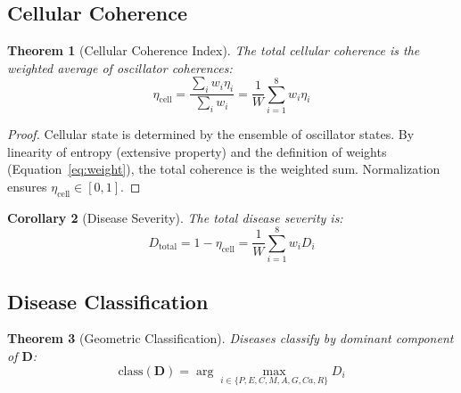 \documentclass[10pt,twocolumn]{article}
\theoremstyle{plain}
\newtheorem{theorem}{Theorem}[section]
\newtheorem{corollary}[theorem]{Corollary}
\theoremstyle{definition}
\theoremstyle{remark}
\newcommand{\etacell}{\eta_{\mathrm{cell}}}
\newcommand{\Dvec}{\mathbf{D}}
\begin{document}
\subsection{Cellular Coherence}

\begin{theorem}[Cellular Coherence Index]
\label{thm:cellular_coherence}
The total cellular coherence is the weighted average of oscillator coherences:
\begin{equation}
\etacell = \frac{\sum_i w_i \eta_i}{\sum_i w_i} = \frac{1}{W}\sum_{i=1}^{8} w_i \eta_i
\label{eq:cellular_coherence}
\end{equation}
\end{theorem}

\begin{proof}
Cellular state is determined by the ensemble of oscillator states. By linearity of entropy (extensive property) and the definition of weights (Equation~\ref{eq:weight}), the total coherence is the weighted sum. Normalization ensures $\etacell \in [0,1]$.
\end{proof}

\begin{corollary}[Disease Severity]
\label{cor:severity}
The total disease severity is:
\begin{equation}
D_{\mathrm{total}} = 1 - \etacell = \frac{1}{W}\sum_{i=1}^{8} w_i D_i
\label{eq:severity}
\end{equation}
\end{corollary}

\subsection{Disease Classification}

\begin{theorem}[Geometric Classification]
\label{thm:classification}
Diseases classify by dominant component of $\Dvec$:
\begin{equation}
\mathrm{class}(\Dvec) = \arg\max_{i \in \{P,E,C,M,A,G,Ca,R\}} D_i
\label{eq:classification}
\end{equation}
\end{theorem}
\end{document}
